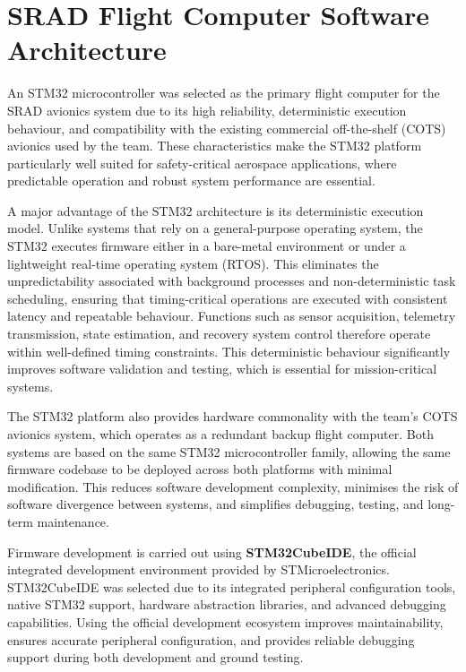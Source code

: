 \section{SRAD Flight Computer Software Architecture}
\label{sec:Programming of the SRAD Computer}

An STM32 microcontroller was selected as the primary flight computer for the SRAD avionics system due to its high reliability, deterministic execution behaviour, and compatibility with the existing commercial off-the-shelf (COTS) avionics used by the team. These characteristics make the STM32 platform particularly well suited for safety-critical aerospace applications, where predictable operation and robust system performance are essential.

A major advantage of the STM32 architecture is its deterministic execution model. Unlike systems that rely on a general-purpose operating system, the STM32 executes firmware either in a bare-metal environment or under a lightweight real-time operating system (RTOS). This eliminates the unpredictability associated with background processes and non-deterministic task scheduling, ensuring that timing-critical operations are executed with consistent latency and repeatable behaviour. Functions such as sensor acquisition, telemetry transmission, state estimation, and recovery system control therefore operate within well-defined timing constraints. This deterministic behaviour significantly improves software validation and testing, which is essential for mission-critical systems.

The STM32 platform also provides hardware commonality with the team’s COTS avionics system, which operates as a redundant backup flight computer. Both systems are based on the same STM32 microcontroller family, allowing the same firmware codebase to be deployed across both platforms with minimal modification. This reduces software development complexity, minimises the risk of software divergence between systems, and simplifies debugging, testing, and long-term maintenance.

Firmware development is carried out using \textbf{STM32CubeIDE}, the official integrated development environment provided by STMicroelectronics. STM32CubeIDE was selected due to its integrated peripheral configuration tools, native STM32 support, hardware abstraction libraries, and advanced debugging capabilities. Using the official development ecosystem improves maintainability, ensures accurate peripheral configuration, and provides reliable debugging support during both development and ground testing.

